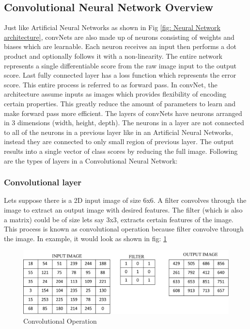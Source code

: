 \documentclass[11pt]{article}
\begin{document}
\subsection{Convolutional Neural Network Overview}
Just like Artificial Neural Networks as shown in Fig \ref{fig: Neural Network architecture}, convNets are also made up of neurons consisting of weights and biases which are learnable. Each neuron receives an input then performs a dot product and optionally follows it with a non-linearity. The entire network represents a single differentiable score from the raw image input to the output score. Last fully connected layer has a loss function which represents the error score. This entire process is referred to as forward pass. In convNet, the architecture assume inputs as images which provides flexibility of encoding certain properties. This greatly reduce the amount of parameters to learn and make forward pass more efficient. The layers of convNets have neurons arranged in 3 dimensions (width, height, depth). The neurons in a layer are not connected to all of the neurons in a previous layer like in an Artificial Neural Networks, instead they are connected to only small region of previous layer. The output results into a single vector of class scores by reducing the full image. Following are the types of layers in a Convolutional Neural Network:

\subsubsection{Convolutional layer}
Lets suppose there is a 2D input image of size 6x6. A filter convolves through the image to extract an output image with desired features. The filter (which is also a matrix) could be of size lets say 3x3, extracts certain features of the image. This process is known as convolutional operation because filter convolve through the image. In example, it would look as shown in fig: \ref{fig:Convolutional Operation}

\begin{figure}[H]
	\centering
	\includegraphics[width=.6\linewidth]{files/cnn_architecture/conv.png}
	\caption{Convolutional Operation}
	\label{fig:Convolutional Operation}
\end{figure}
\end{document}
